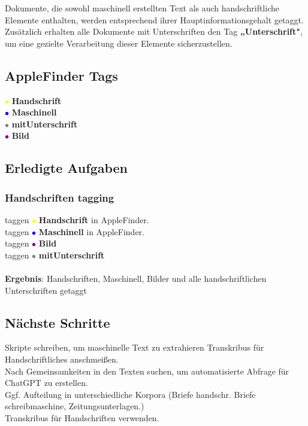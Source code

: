 \documentclass{article}
\begin{document}
Dokumente, die sowohl maschinell erstellten Text als auch handschriftliche Elemente enthalten, werden entsprechend ihrer Hauptinformationsgehalt getaggt. Zusätzlich erhalten alle Dokumente mit Unterschriften den Tag \textbf{„Unterschrift"}, um eine gezielte Verarbeitung dieser Elemente sicherzustellen.

\subsection{AppleFinder Tags}

\textcolor{yellow}{\Large $\bullet$} \textbf{Handschrift} \\
\textcolor{blue}{\Large $\bullet$} \textbf{Maschinell} \\
\textcolor{gray}{\Large $\bullet$} \textbf{mitUnterschrift} \\
\textcolor{purple}{\Large $\bullet$} \textbf{Bild} \\

\subsection*{Erledigte Aufgaben}
\subsubsection*{\small Handschriften tagging}
 taggen \textcolor{yellow}{\Large $\bullet$} \textbf{Handschrift} in AppleFinder. \\
 taggen \textcolor{blue}{\Large $\bullet$} \textbf{Maschinell} in AppleFinder. \\
 taggen \textcolor{purple}{\Large $\bullet$} \textbf{Bild} \\
 taggen \textcolor{gray}{\Large $\bullet$} \textbf{mitUnterschrift} \\
\\
\textbf{Ergebnis}: Handschriften, Maschinell, Bilder und alle handschriftlichen Unterschriften getaggt

\subsection*{Nächste Schritte}
 Skripte schreiben, um maschinelle Text zu extrahieren 
 Transkribus für Handschriftliches anschmeißen. \\
 Nach Gemeinsamkeiten in den Texten suchen, um automatisierte Abfrage für ChatGPT zu erstellen. \\ 
 Ggf. Aufteilung in unterschiedliche Korpora (Briefe handschr. Briefe schreibmaschine, Zeitungsunterlagen.)\\
 Transkribus für Handschriften verwenden. \\
\end{document}
